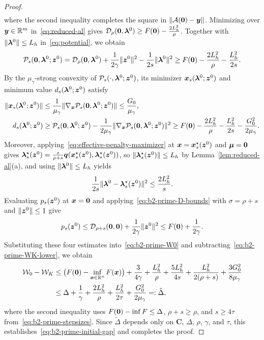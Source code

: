 \begin{proof}
\begin{align*}
\end{align*}
where the second inequality completes the square in \(\|\mathcal{A}(\bm{0})-\bm{y}\|\).
Minimizing over \(\bm{y}\in\mathbb{R}^m\) in~\eqref{eq:reduced-al} gives
\(\mathcal{D}_\rho(\bm{0},\bm{\lambda}^0)\ge F(\bm{0})-\frac{2L_h^2}{\rho}\). Together with
\(\|\bm{\lambda}^0\|\le L_h\) in~\eqref{eq:potential}, we obtain
\[
    \mathcal P_s(\bm{0},\bm{\lambda}^0;\bm{z}^0)
    =\mathcal{D}_\rho(\bm{0},\bm{\lambda}^0)+\frac{1}{2\gamma}\|\bm{z}^0\|^2
    -\frac{1}{2s}\|\bm{\lambda}^0\|^2
    \ge F(\bm{0})-\frac{2L_h^2}{\rho}-\frac{L_h^2}{2s}.
\]
By the \(\mu_\gamma\)-strong convexity of
\(\mathcal P_s(\cdot,\bm{\lambda}^0;\bm{z}^0)\), its minimizer \(\bm{x}_s(\bm{\lambda}^0;\bm{z}^0)\)
and minimum value \(d_s(\bm{\lambda}^0;\bm{z}^0)\) satisfy
\begin{align*}
    \|\bm{x}_s(\bm{\lambda}^0;\bm{z}^0)\|
    &\le\frac{1}{\mu_\gamma}\|\nabla_{\bm{x}}\mathcal P_s(\bm{0},\bm{\lambda}^0;\bm{z}^0)\|
    \le\frac{G_0}{\mu_\gamma},\\
    d_s(\bm{\lambda}^0;\bm{z}^0)
    &\ge\mathcal P_s(\bm{0},\bm{\lambda}^0;\bm{z}^0)
    -\frac{1}{2\mu_\gamma}\|\nabla_{\bm{x}}\mathcal P_s(\bm{0},\bm{\lambda}^0;\bm{z}^0)\|^2
    \ge F(\bm{0})-\frac{2L_h^2}{\rho}-\frac{L_h^2}{2s}-\frac{G_0^2}{2\mu_\gamma}.
\end{align*}
Moreover, applying~\eqref{eq:effective-penalty-maximizer} at
\(\bm{x}=\bm{x}_s^\star(\bm{z}^0)\) and \(\bm{\mu}=\bm{0}\) gives
\(\bm{\lambda}_s^\star(\bm{z}^0)
=\frac{s}{\rho+s}\bm{q}(\bm{x}_s^\star(\bm{z}^0),\bm{\lambda}_s^\star(\bm{z}^0))\), so
\(\|\bm{\lambda}_s^\star(\bm{z}^0)\|\le L_h\) by Lemma~\ref{lem:reduced-al}(a), and
using \(\|\bm{\lambda}^0\|\le L_h\) yields
\[
    \frac{1}{2s}\|\bm{\lambda}^0-\bm{\lambda}_s^\star(\bm{z}^0)\|^2\le\frac{2L_h^2}{s}.
\]
Evaluating \(p_s(\bm{z}^0)\) at \(\bm{x}=\bm{0}\) and applying~\eqref{eq:b2-prime-D-bounds}
with \(\sigma=\rho+s\) and \(\|\bm{z}^0\|\le1\) give
\[
    p_s(\bm{z}^0)\le\mathcal{D}_{\rho+s}(\bm{0},\bm{0})+\frac{1}{2\gamma}\|\bm{z}^0\|^2
    \le F(\bm{0})+\frac{1}{2\gamma}.
\]
Substituting these four estimates into~\eqref{eq:b2-prime-W0} and subtracting~\eqref{eq:b2-prime-WK-lower}, we obtain
\begin{align*}
    \mathcal W_0-\mathcal W_K
    &\le\bigl(F(\bm{0})-\inf_{\bm{x}\in\mathbb{R}^n}F(\bm{x})\bigr)
    +\frac{3}{4\gamma}+\frac{L_h^2}{\rho}+\frac{5L_h^2}{4s}
    +\frac{L_h^2}{2(\rho+s)}+\frac{3G_0^2}{8\mu_\gamma}\\
    &\le\Delta+\frac1\gamma+\frac{2L_h^2}{\rho}+\frac{L_h^2}{2\tau}
    +\frac{G_0^2}{2\mu_\gamma}=:\tilde{\Delta},
\end{align*}
where the second inequality uses \(F(\bm{0})-\inf F\le\Delta\),
\(\rho+s\ge\rho\), and \(s\ge4\tau\) from~\eqref{eq:b2-prime-stepsizes}. Since
\(\tilde{\Delta}\) depends only on \(\mathbf C\), \(\Delta\), \(\rho\),
\(\gamma\), and \(\tau\), this establishes~\eqref{eq:b2-prime-initial-gap} and
completes the proof.
\end{proof}

